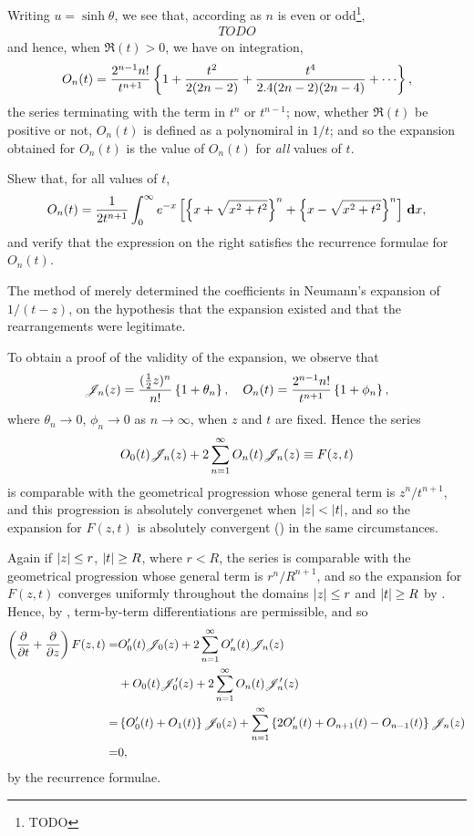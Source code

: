 Writing $u = \sinh \theta$, we see that, according as $n$ is even or
odd\footnote{TODO},
\begin{align*}
  TODO
\end{align*}
and hence, when $\Re(t) > 0$, we have on integration,
$$
O_{n}(t)
=
\frac{2^{n-1} n!}{t^{n+1}}
\thebrace{
  1
  + \frac{t^{2}}{2 (2n-2)}
  + \frac{t^{4}}{ 2.4 (2n-2)(2n-4)}
  + \cdots
},
$$
the series terminating with the term in $t^{n}$ or $t^{n-1}$; now,
whether $\Re(t)$ be positive or not,
$O_{n}(t)$ is defined as a polynomiral in $1/t$; and so the expansion
obtained for $O_{n}(t)$ is the value of $O_{n}(t)$ for \emph{all} values
of $t$.
\begin{wandwexample}
  Shew that, for all values of $t$,
  $$
  O_{n}(t)
  =
  \frac{1}{2 t^{n+1}}
  \int_{0}^{\infty}
  e^{-x}
  \left[ 
    \left\{ x + \sqrt{x^{2} + t^{2}} \right\}^{n}
    +
    \left\{ x - \sqrt{x^{2} + t^{2}} \right\}^{n}
   \right]
  \, \mathbf{d} x,
  $$
  and verify that the expression on the right satisfies the recurrence
  formulae for $O_{n}(t)$.
\end{wandwexample}
The method of  merely determined the
coefficients in Neumann's expansion of $1/(t-z)$, on the hypothesis
that the expansion existed and that the rearrangements were
legitimate.

To obtain a proof of the validity of the expansion, we observe that
$$
\mathscr{J}_{n}(z)
=
\frac{(\frac{1}{2} z)^{n}}{n!} 
\left\{ 1 + \theta_{n} \right\},
\quad
O_{n}(t)
=
\frac{2^{n-1} n!}{t^{n+1}}
\left\{  1 + \phi_{n} \right\},
$$
%
%
where $\theta_{n} \rightarrow 0$, $\phi_{n} \rightarrow 0$ as $n
\rightarrow \infty$, when $z$ and $t$ are fixed. Hence the series
$$
O_{0}(t) \mathscr{J}_{n}(z)
+
2
\sum_{n=1}^{\infty}
O_{n}(t) \mathscr{J}_{n}(z)
\equiv
F(z,t)
$$
is comparable with the geometrical progression whose general term is
$z^{n} / t^{n+1}$, and this progression is absolutely convergenet when
$\left| z \right| < \left| t \right|$, and so the expansion for $F(z,t)$ is
absolutely convergent () in the same
circumstances.

Again if $\left| z \right| \leq r$, $\left| t \right| \geq R$, where $r < R$, the
series is comparable with the geometrical progression whose general
term is $r^{n} / R^{n+1}$, and so the expansion for $F(z,t)$ converges
uniformly throughout the domains $\left| z \right| \leq r$ and $\left| t \right|
\geq R$ by . Hence, by
, term-by-term differentiations are permissible,
and so
\begin{align*}
  \left(  \frac{\partial}{\partial t} + \frac{\partial}{\partial z}
   \right)
  F(z,t)
  =&
  O_{0}'(t) \mathscr{J}_{0}(z)
  + 2 \sum_{n=1}^{\infty} O_{n}'(t) \mathscr{J}_{n}(z)
  \\
  &
  + O_{0}(t) \mathscr{J}'_{0}(z)
  + 2 \sum_{n=1}^{\infty}
  O_{n}(t) \mathscr{J}'_{n}(z)
  \\
  =&
  \left\{  O_{0}'(t) + O_{1}(t) \right\} \mathscr{J}_{0}(z)
  + \sum_{n=1}^{\infty} \left\{ 
    2 O_{n}'(t) + O_{n+1}(t) - O_{n-1}(t)
   \right\}
  \mathscr{J}_{n}(z)
  \\
  =&
  0,
\end{align*}
by the recurrence formulae.

